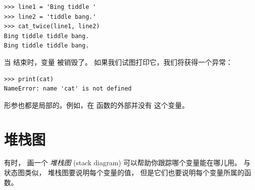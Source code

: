 \begin{lstlisting}
>>> line1 = 'Bing tiddle '
>>> line2 = 'tiddle bang.'
>>> cat_twice(line1, line2)
Bing tiddle tiddle bang.
Bing tiddle tiddle bang.
\end{lstlisting}

%

当  结束时，变量  被销毁了。
如果我们试图打印它，我们将获得一个异常：
  

\begin{lstlisting}
>>> print(cat)
NameError: name 'cat' is not defined
\end{lstlisting}

%

形参也都是局部的。例如，在  函数的外部并没有  这个变量。


%
\section{堆栈图}
\label{stackdiagram}

    


有时， 画一个 {\em 堆栈图} (stack diagram) 可以帮助你跟踪哪个变量能在哪儿用。  
与状态图类似， 堆栈图要说明每个变量的值， 但是它们也要说明每个变量所属的函数。  
  


